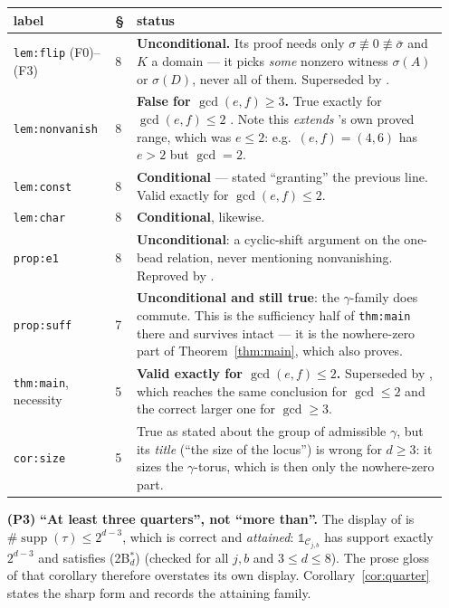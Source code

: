 \documentclass[11pt]{article}
\theoremstyle{definition}
\theoremstyle{remark}
\newcommand{\Cyl}{\mathcal{C}}           %
\newcommand{\one}{\mathbb{1}}
\newcommand{\supp}{\operatorname{supp}}
\begin{document}
\begin{itemize}
  \medskip
  \begin{tabular}{@{}llp{}@{}}
  \hline
  label & \S & status\\
  \hline
  \texttt{lem:flip} (F0)--(F3) & 8 & \textbf{Unconditional.}  Its proof needs only
    $\sigma\not\equiv0\not\equiv\bar\sigma$ and $K$ a domain --- it picks \emph{some} nonzero
    witness $\sigma(A)$ or $\sigma(D)$, never all of them.  Superseded by
    \cite[\texttt{prop:1B}]{Q150c1}.\\
  \texttt{lem:nonvanish} & 8 & \textbf{False for $\gcd(e,f)\ge3$.}  True exactly for
    $\gcd(e,f)\le2$ \cite[\texttt{thm:gcdle2}]{Q150c1}.  Note this \emph{extends}
    \cite{Q149}'s own proved range, which was $e\le2$: e.g.\ $(e,f)=(4,6)$ has $e>2$ but
    $\gcd=2$.\\
  \texttt{lem:const} & 8 & \textbf{Conditional} --- stated ``granting'' the previous line.
    Valid exactly for $\gcd(e,f)\le2$.\\
  \texttt{lem:char} & 8 & \textbf{Conditional}, likewise.\\
  \texttt{prop:e1} & 8 & \textbf{Unconditional}: a cyclic-shift argument on the one-bead
    relation, never mentioning nonvanishing.  Reproved by
    \cite[\texttt{cor:coprime}]{Q150c1}.\\
  \hline
  \texttt{prop:suff} & 7 & \textbf{Unconditional and still true}: the $\gamma$-family does
    commute.  This is the sufficiency half of \texttt{thm:main} there and survives intact ---
    it is the nowhere-zero part of Theorem~\ref{thm:main}, which
    \cite[\texttt{thm:main0}]{Q150c1} also proves.\\
  \texttt{thm:main}, necessity & 5 & \textbf{Valid exactly for $\gcd(e,f)\le2$.}  Superseded
    by \cite[\texttt{thm:main0}]{Q150c1}, which reaches the same conclusion for $\gcd\le2$ and
    the correct larger one for $\gcd\ge3$.\\
  \texttt{cor:size} & 5 & True as stated about the group of admissible $\gamma$, but its
    \emph{title} (``the size of the locus'') is wrong for $d\ge3$: it sizes the
    $\gamma$-torus, which is then only the nowhere-zero part.\\
  \hline
  \end{tabular}

\item[\textbf{(P3)}] \textbf{``At least three quarters'', not ``more than''.}  The display of
  \cite[\texttt{cor:quarter}]{Q150c2} is $\#\supp(\tau)\le2^{d-3}$, which is correct and
  \emph{attained}: $\one_{\Cyl_{j,b}}$ has support exactly $2^{d-3}$ and satisfies
  (2B$^{*}_d$) (checked for all $j,b$ and $3\le d\le8$).  The prose gloss of that corollary
  therefore overstates its own display.  Corollary~\ref{cor:quarter} states the sharp form and
  records the attaining family.


\end{itemize}
\end{document}
